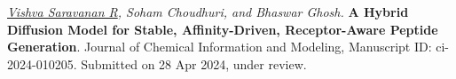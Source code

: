\noindent
\textit{\underline{Vishva Saravanan R}, Soham Choudhuri, and Bhaswar Ghosh.} \textbf{A Hybrid Diffusion Model for Stable, Affinity-Driven, Receptor-Aware Peptide Generation}. Journal of Chemical Information and Modeling, Manuscript ID: ci-2024-010205. Submitted on 28 Apr 2024, under review.
